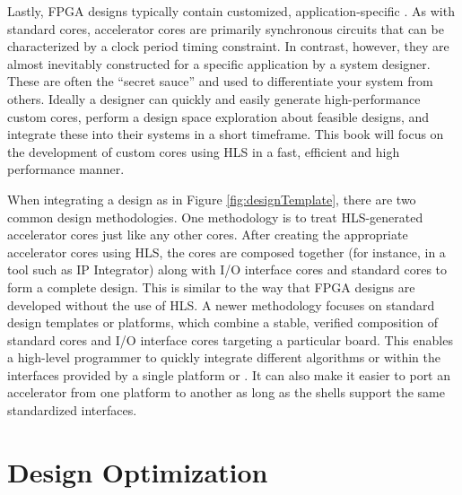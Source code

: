 Lastly, FPGA designs typically contain customized, application-specific .  As with standard cores, accelerator cores are primarily synchronous circuits that can be characterized by a clock period timing constraint.  In contrast, however, they are almost inevitably constructed for a specific application by a system designer.  These are often the ``secret sauce'' and used to differentiate your system from others. Ideally a designer can quickly and easily generate high-performance custom cores, perform a design space exploration about feasible designs, and integrate these into their systems in a short timeframe. This book will focus on the development of custom cores using HLS in a fast, efficient and high performance manner.

When integrating a design as in Figure \ref{fig:designTemplate}, there are two common design methodologies.  One methodology is to treat HLS-generated accelerator cores just like any other cores.  After creating the appropriate accelerator cores using HLS, the cores are composed together (for instance, in a tool such as \vivado IP Integrator) along with I/O interface cores and standard cores to form a complete design.  This  is similar to the way that FPGA designs are developed without the use of HLS.  A newer methodology focuses on standard design templates or platforms, which combine a stable, verified composition of standard cores and I/O interface cores targeting a particular board. This  enables a high-level programmer to quickly integrate different algorithms or  within the interfaces provided by a single platform or .  It can also make it easier to port an accelerator from one platform to another as long as the shells support the same standardized interfaces.


\section{Design Optimization}
\label{sec:designOptimization}

